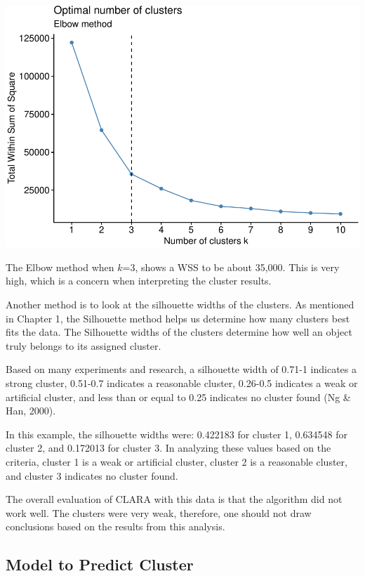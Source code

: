 \documentclass[12pt,twoside]{amherstthesis}
\begin{document}
  \begin{center}\includegraphics{Comps_Proj_files/figure-latex/unnamed-chunk-11-1} \end{center}
  
  The Elbow method when \(k\)=3, shows a WSS to be about 35,000. This is
  very high, which is a concern when interpreting the cluster results.
  
  Another method is to look at the silhouette widths of the clusters. As
  mentioned in Chapter 1, the Silhouette method helps us determine how
  many clusters best fits the data. The Silhouette widths of the clusters
  determine how well an object truly belongs to its assigned cluster.
  
  Based on many experiments and research, a silhouette width of 0.71-1
  indicates a strong cluster, 0.51-0.7 indicates a reasonable cluster,
  0.26-0.5 indicates a weak or artificial cluster, and less than or equal
  to 0.25 indicates no cluster found (Ng \& Han, 2000).
  
  In this example, the silhouette widths were: 0.422183 for cluster 1,
  0.634548 for cluster 2, and 0.172013 for cluster 3. In analyzing these
  values based on the criteria, cluster 1 is a weak or artificial cluster,
  cluster 2 is a reasonable cluster, and cluster 3 indicates no cluster
  found.
  
  The overall evaluation of CLARA with this data is that the algorithm did
  not work well. The clusters were very weak, therefore, one should not
  draw conclusions based on the results from this analysis.
  
  \subsection{Model to Predict Cluster}\label{model-to-predict-cluster}
  
\end{document}

